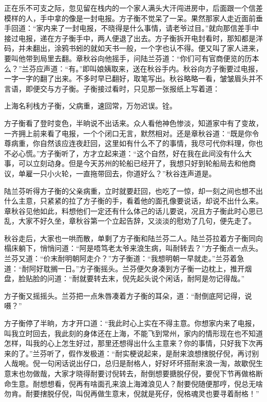 \documentclass[12pt,UTF8]{ctexbook}
\begin{document}
{{{正在乐不可支之际，忽见留在栈内的一个家人满头大汗闯进房中，后面跟一个信差模样的人，手中拿的像是一封电报。方子衡不觉呆了一呆。果然那家人走近面前垂手回道：“家内来了一封电报，不晓得是什么事情，请老爷过目。”就向那信差手中接过电报，递在方子衡手中，两人便退了出去。方子衡拆开电封看时，那知都是洋码，并未翻出，涂鸦书蚓的就如天书一般，一个字也认不得。便又叫了家人进来，要叫他带到局里去翻。章秋谷向他摇手，问陆兰芬道：“你们可有官商便览的历本么？”兰芬应声道：“有。”即叫娘姨取来，送在秋谷手内。秋谷向方子衡要过电报，一字一字的翻了出来。不多时早已翻好，取笔写出。秋谷略略一看，皱皱眉头并不言语，即便交与方子衡。子衡接过看时，只见那一张报纸上写着道：

上海名利栈方子衡，父病重，速回常，万勿迟误。铨。

方子衡看了登时变色，半晌说不出话来。众人看他神色惨淡，知道家中有了变故，一齐拥上前来看了电报，一个个闭口无言，默然相对。还是章秋谷道：“既是你令尊病重，你自然该应连夜赶回，这里如有什么不了的事情，我尽可代你料理，你也不必心慌。”方子衡听了，方才立起来道：“这个自然，好在我在此间没有什么大事，可以立刻动身。但是今天苏州的轮船已经开了，我想只好到轮船局去和他商议，单雇一只小火轮，一直拖带回去，你道好么？”秋谷连声道是。

陆兰芬听得方子衡的父亲病重，立时就要赶回，也吃了一惊，却一刻之间也想不出什么主意，只紧紧的拉了方子衡的手，看着他的面孔像要说话，却说不出什么来。章秋谷见他如此，料想他们一定还有什么体己的话儿要说，况且方子衡此时心思已乱，大家不好久坐，章秋谷第一个立起告辞，又淡淡的慰劝了几句，便先走了。

秋谷走后，大家也一哄而散，单剩了方子衡和陆兰芬二人。陆兰芬拉着方子衡同向榻床躺下，悄悄问道：“阿是唔笃老太爷来浪生病，叫耐转去？”方子衡点一点头。兰芬又道：“价末耐明朝阿走介？”方子衡道：“我想明朝一早就走。”兰芬着急道：“耐阿好耽搁一日。”方子衡摇头。兰芬便欠身凑到方子衡一边枕上，推开烟盘，脸贴脸的问道：“耐就要转去末，倪先起头说个闲话，耐阿是勿记得哉。”

方子衡又摇摇头。兰芬把一点朱唇凑着方子衡的耳朵，道：“耐倒底阿记得，说嗫？”

方子衡停了半晌，方才开口道：“我此时心上实在不得主意。你想家内来了电报，叫我立时回去，我此刻的身体还在上海，不能飞到常州，家内的情形现在也不知道怎样，叫我的心上怎生好过，那里还想得出什么主意来？你的事情，只好我下次再来的了。”兰芬听了，假作发极道：“耐实梗说起来，是耐来浪想搳脱仔倪，再讨别人哉啘。倪一句闲话说出仔口，总归是耐格人，好好坏坏搭耐来浪一淘，故歇倪生意末也勿做哉，大家才晓得耐要讨倪转去，耐倒想要搪脱仔倪，要倪下节再做格断命生意。耐想想看，倪再有啥面孔来浪上海滩浪见人？耐要倪随便那哼，倪总无啥勿肯。耐要搳脱仔倪，叫倪再做生意末，倪就是死仔，倪格魂灵也要寻着耐格！”

}}}
\end{document}

